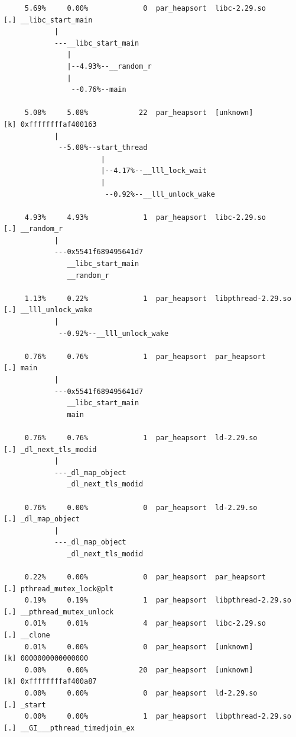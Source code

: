\documentclass{article}
\begin{document}
\begin{verbatim}
     5.69%     0.00%             0  par_heapsort  libc-2.29.so        [.] __libc_start_main
            |
            ---__libc_start_main
               |
               |--4.93%--__random_r
               |
                --0.76%--main

     5.08%     5.08%            22  par_heapsort  [unknown]           [k] 0xffffffffaf400163
            |
             --5.08%--start_thread
                       |
                       |--4.17%--__lll_lock_wait
                       |
                        --0.92%--__lll_unlock_wake

     4.93%     4.93%             1  par_heapsort  libc-2.29.so        [.] __random_r
            |
            ---0x5541f689495641d7
               __libc_start_main
               __random_r

     1.13%     0.22%             1  par_heapsort  libpthread-2.29.so  [.] __lll_unlock_wake
            |
             --0.92%--__lll_unlock_wake

     0.76%     0.76%             1  par_heapsort  par_heapsort        [.] main
            |
            ---0x5541f689495641d7
               __libc_start_main
               main

     0.76%     0.76%             1  par_heapsort  ld-2.29.so          [.] _dl_next_tls_modid
            |
            ---_dl_map_object
               _dl_next_tls_modid

     0.76%     0.00%             0  par_heapsort  ld-2.29.so          [.] _dl_map_object
            |
            ---_dl_map_object
               _dl_next_tls_modid

     0.22%     0.00%             0  par_heapsort  par_heapsort        [.] pthread_mutex_lock@plt
     0.19%     0.19%             1  par_heapsort  libpthread-2.29.so  [.] __pthread_mutex_unlock
     0.01%     0.01%             4  par_heapsort  libc-2.29.so        [.] __clone
     0.01%     0.00%             0  par_heapsort  [unknown]           [k] 0000000000000000
     0.00%     0.00%            20  par_heapsort  [unknown]           [k] 0xffffffffaf400a87
     0.00%     0.00%             0  par_heapsort  ld-2.29.so          [.] _start
     0.00%     0.00%             1  par_heapsort  libpthread-2.29.so  [.] __GI___pthread_timedjoin_ex
\end{verbatim}
\normalsize
\end{document}
